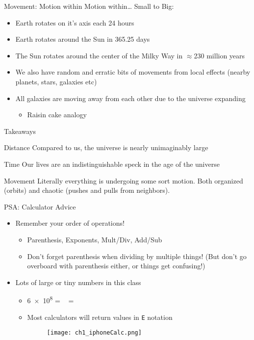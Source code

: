 \documentclass[pdf,aspectratio=169]{beamer}
\begin{document}
\begin{frame}{Movement: Motion within Motion within\ldots}
  Small to Big:
  \begin{itemize}
	\item Earth rotates on it's axis each 24 hours
	\item Earth rotates around the Sun in 365.25 days
	\item The Sun rotates around the center of the Milky Way in $\approx$230 million years
	\item We also have random and erratic bits of movements from local effects (nearby planets, stars, galaxies etc)
	\item All galaxies are moving away from each other due to the universe expanding
	  \begin{itemize}
		\item Raisin cake analogy
	  \end{itemize}
  \end{itemize}
\end{frame}

\begin{frame}{Takeaways}
  \begin{alertblock}{Distance}
	Compared to us, the universe is nearly unimaginably large
  \end{alertblock}
  \begin{alertblock}{Time}
	Our lives are an indistinguishable speck in the age of the universe
  \end{alertblock}
  \begin{alertblock}{Movement}
	Literally everything is undergoing some sort motion. Both organized (orbits) and chaotic (pushes and pulls from neighbors).
  \end{alertblock}
\end{frame}

\begin{frame}{PSA: Calculator Advice}
  \begin{itemize}
	\item Remember your order of operations!
	  \begin{itemize}
		\item Parenthesis, Exponents, Mult/Div, Add/Sub
		\item Don't forget parenthesis when dividing by multiple things! (But don't go overboard with parenthesis either, or things get confusing!)
	  \end{itemize}
	\item Lots of large or tiny numbers in this class
	  \begin{itemize}
		  \item \num{6e8} = \texttt{ \fbox{$\times$}  } = \texttt{  }
		\item Most calculators will return values in \texttt{E} notation
		  \begin{figure}[h!]
			\centering
			\texttt{[image: ch1\_iphoneCalc.png]}
		  \end{figure}
	  \end{itemize}
  \end{itemize}
\end{frame}
\end{document}
